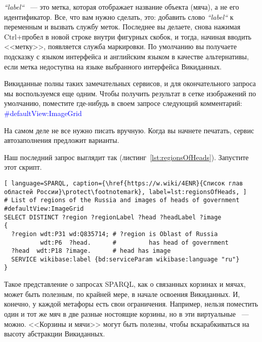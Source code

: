\textit{``label``} ~--- это метка, которая отображает название объекта (мяча), а не его идентификатор. Все, что вам нужно сделать, это: добавить слово \textit{``label``} к переменным и вызвать службу меток. Последнее вы делаете, снова нажимая Ctrl+пробел в новой строке внутри фигурных скобок, и тогда, начиная вводить <<метку>>, появляется служба маркировки. По умолчанию вы получаете подсказку с языком интерфейса и английским языком в качестве альтернативы, если метка недоступна на языке выбранного интерфейса Викиданных.

Викиданные полны таких замечательных сервисов, и для окончательного запроса мы воспользуемся еще одним. Чтобы получить результат в сетке изображений по умолчанию, поместите где-нибудь в своем запросе следующий комментарий: \textcolor{blue}{\#defaultView:ImageGrid}

На самом деле не все нужно писать вручную. Когда вы начнете печатать, сервис автозаполнения предложит варианты.

\newpage
Наш последний запрос выглядит так (листинг~\ref{lst:regionsOfHeads}). Запустите этот скрипт.

\begin{lstlisting}[ language=SPARQL, caption={\href{https://w.wiki/4ENR}{Список глав областей России}\protect\footnotemark}, label=lst:regionsOfHeads, ]
# List of regions of the Russia and images of heads of government
#defaultView:ImageGrid
SELECT DISTINCT ?region ?regionLabel ?head ?headLabel ?image
{
  ?region wdt:P31 wd:Q835714; # ?region is Oblast of Russia
          wdt:P6  ?head.      #         has head of government
  ?head  wdt:P18 ?image.      # head has image
  SERVICE wikibase:label {bd:serviceParam wikibase:language "ru"} 
}
\end{lstlisting}

Такое представление о запросах SPARQL, как о связанных корзинах и мячах, может быть полезным, по крайней мере, в начале освоения Викиданных. И, конечно, у каждой метафоры есть свои ограничения. Например, нельзя поместить один и тот же мяч в две разные ностоящие корзины, но в эти виртуальные ~--- можно. <<Корзины и мячи>> могут быть полезны, чтобы вскарабкиваться на высоту абстракции Викиданных.